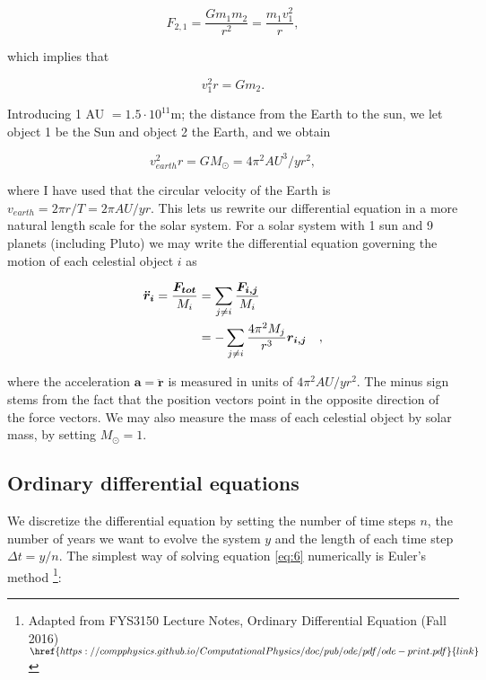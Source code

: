 \documentclass[%
 reprint,
 nobalance,
 amsmath,amssymb,
 aps,
]{revtex4-1}
\begin{document}
\begin{equation}
	F_{2,1} = \frac{Gm_1 m_2}{r^2} = \frac{m_1 v_{1}^{2}}{r},
\end{equation}

which implies that

\begin{equation}
	v_{1}^{2}r = G m_2.
\end{equation}

Introducing 1 AU $= 1.5\cdot10^{11}$m; the distance from the Earth to the sun, we let object 1 be the Sun and object 2 the Earth, and we obtain

\begin{equation}
	v_{earth}^2 r = G M_{\odot} = 4\pi^{2} AU^{3}/yr^{2},
\end{equation}

where I have used that the circular velocity of the Earth is $v_{earth} = 2\pi r/T = 2\pi AU/yr$. This lets us rewrite our differential equation in a more natural length scale for the solar system. For a solar system with 1 sun and 9 planets (including Pluto) we may write the differential equation governing the motion of each celestial object $i$ as

\begin{equation}{\label{eq:6}}
\begin{split}
	\bm{\ddot r_i} = \frac{\bm{F_{tot}}}{M_i}
	&= \sum_{j \neq i} \frac{\bm{F_{i,j}}}{M_i} \\
	&= -\sum_{j \neq i} \frac{4 \pi^{2} M_j}{r^{3}} \bm{r_{i,j}} \quad,
\end{split}
\end{equation}

where the acceleration $\bm{a = \ddot r}$ is measured in units of $4\pi^{2} AU/yr^{2}$. The minus sign stems from the fact that the position vectors point in the opposite direction of the force vectors. We may also measure the mass of each celestial object by solar mass, by setting $M_{\odot} = 1$. \\

\subsection{\label{sec:ODE}Ordinary differential equations}
We discretize the differential equation by setting the number of time steps $n$, the number of years we want to evolve the system $y$ and the length of each time step $\Delta t = y/n$. The simplest way of solving equation \eqref{eq:6} numerically is Euler's method \footnote{Adapted from FYS3150 Lecture Notes, Ordinary Differential Equation (Fall 2016) $\href{https://compphysics.github.io/ComputationalPhysics/doc/pub/ode/pdf/ode-print.pdf}{link}$}:
\end{document}
